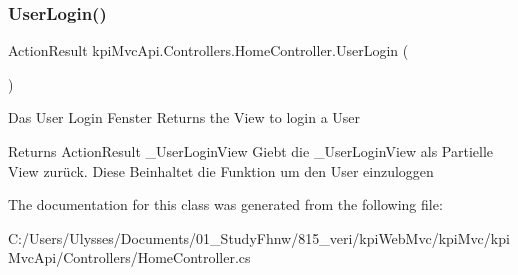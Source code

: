 \subsubsection{\texorpdfstring{User\+Login()}{UserLogin()}\hspace{0.1cm}{\footnotesize\ttfamily [2/2]}}
{\footnotesize\ttfamily Action\+Result kpi\+Mvc\+Api.\+Controllers.\+Home\+Controller.\+User\+Login (\begin{DoxyParamCaption}{ }\end{DoxyParamCaption})\hspace{0.3cm}{\ttfamily [inline]}}



Das User Login Fenster Returns the View to login a User 

\begin{DoxyReturn}{Returns}
{\ttfamily Action\+Result \+\_\+\+User\+Login\+View} Giebt die \+\_\+\+User\+Login\+View als Partielle View zurück. Diese Beinhaltet die Funktion um den User einzuloggen 
\end{DoxyReturn}


The documentation for this class was generated from the following file\+:\begin{DoxyCompactItemize}
\item 
C\+:/\+Users/\+Ulysses/\+Documents/01\+\_\+\+Study\+Fhnw/815\+\_\+veri/kpi\+Web\+Mvc/kpi\+Mvc/kpi\+Mvc\+Api/\+Controllers/Home\+Controller.\+cs\end{DoxyCompactItemize}

